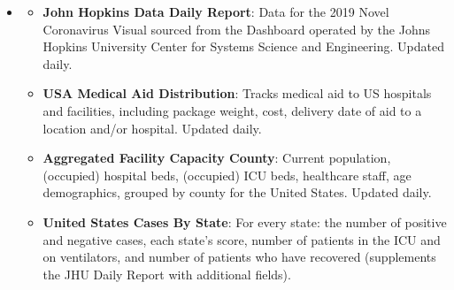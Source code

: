 \documentclass[11pt]{article}
\newcommand{\MYhref}[3][blue]{\href{#2}{\color{#1}{#3}}}%
\begin{document}
\begin{itemize}
    \item \MYhref{https://www.npmjs.com/package/covid19-api}{Covid-19 API}
        \begin{itemize}
        \item \textbf{John Hopkins Data Daily Report}: Data for the 2019 Novel Coronavirus Visual sourced from the Dashboard operated by the Johns Hopkins University Center for Systems Science and Engineering. Updated daily.
        \item \textbf{USA Medical Aid Distribution}: Tracks medical aid to US hospitals and facilities, including package weight, cost, delivery date of aid to a location and/or hospital. Updated daily.
        \item \textbf{Aggregated Facility Capacity County}: Current population, (occupied) hospital beds, (occupied) ICU beds, healthcare staff, age demographics, grouped by county for the United States. Updated daily.
        \item \textbf{United States Cases By State}: For every state: the number of positive and negative cases, each state's score, number of patients in the ICU and on ventilators, and number of patients who have recovered (supplements the JHU Daily Report with additional fields).
    \end{itemize} 
\end{itemize}
\end{document}
